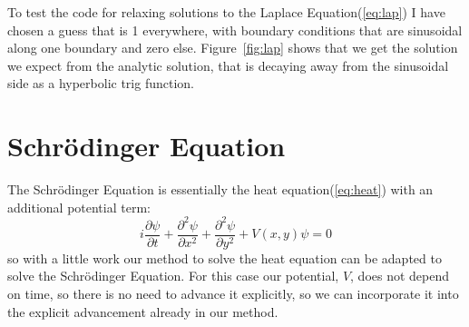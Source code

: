 \documentclass[paper=a4, fontsize=11pt, abstract=on]{scrartcl} %
\numberwithin{equation}{section}
\numberwithin{figure}{section}
\numberwithin{table}{section}
\begin{document}
To test the code for relaxing solutions to the Laplace Equation(\ref{eq:lap}) I have chosen a guess that is 1 everywhere, with boundary conditions that are sinusoidal along one boundary and zero else. Figure~\ref{fig:lap} shows that we get the solution we expect from the analytic solution, that is decaying away from the sinusoidal side as a hyperbolic trig function.

\section{Schr\"{o}dinger Equation}
\label{sec:schrod}

The Schr\"{o}dinger Equation is essentially the heat equation(\ref{eq:heat}) with an additional potential term:
\begin{equation}
  \label{eq:schrod}
  i\frac{\partial \psi}{\partial t} + \frac{\partial^2 \psi}{\partial x^2} + \frac{\partial^2 \psi}{\partial y^2} + V(x,y)\psi = 0
\end{equation}
so with a little work our method to solve the heat equation can be adapted to solve the Schr\"{o}dinger Equation. For this case our potential, $V$, does not depend on time, so there is no need to advance it explicitly, so we can incorporate it into the explicit advancement already in our method. 
\end{document}
